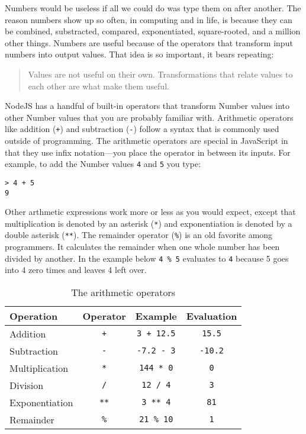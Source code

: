Numbers would be useless if all we could do was type them on after another. The reason numbers show up so often, in computing and in life, is because they can be combined, substracted, compared, exponentiated, square-rooted, and a million other things. Numbers are useful because of the operators that transform input numbers into output values. That idea is so important, it bears repeating:

\begin{quotation}
  Values are not useful on their own. Transformations that relate values to each other are what make them useful.
\end{quotation}

NodeJS has a handful of built-in operators that transform \textsf{Number} values into other \textsf{Number} values that you are probably familiar with. Arithmetic operators like addition (\texttt{+}) and subtraction (\texttt{-}) follow a syntax that is commonly used outside of programming. The arithmetic operators are special in JavaScript in that they use infix notation---you place the operator in between its inputs. For example, to add the \textsf{Number} values \texttt{4} and \texttt{5} you type:

\suppresslinenumbers
\begin{lstlisting}
> 4 + 5
9
\end{lstlisting}

Other arthmetic expressions work more or less as you would expect, except that multiplication is denoted by an asterisk (\texttt{*}) and exponentiation is denoted by a double asterisk (\texttt{**}). The remainder operator (\texttt{\%}) is an old favorite among programmers. It calculates the remainder when one whole number has been divided by another. In the example below \texttt{4 \% 5} evaluates to \texttt{4} because 5 goes into 4 zero times and leaves 4 left over.

\begin{table}
  \begin{tabular}{lccc}
    Operation & Operator & Example & Evaluation\\
    \hline
    Addition & \texttt{+} & \texttt{3 + 12.5} & \texttt{15.5}\\
    Subtraction & \texttt{-} & \texttt{-7.2 - 3} & \texttt{-10.2}\\
    Multiplication & \texttt{*} & \texttt{144 * 0} & \texttt{0}\\
    Division & \texttt{/} & \texttt{12 / 4} & \texttt{3}\\
    Exponentiation & \texttt{**} & \texttt{3 ** 4} & \texttt{81}\\
    Remainder & \texttt{\%} & \texttt{21 \% 10} & \texttt{1}\\
  \end{tabular}
  \caption{The arithmetic operators}
\end{table}

